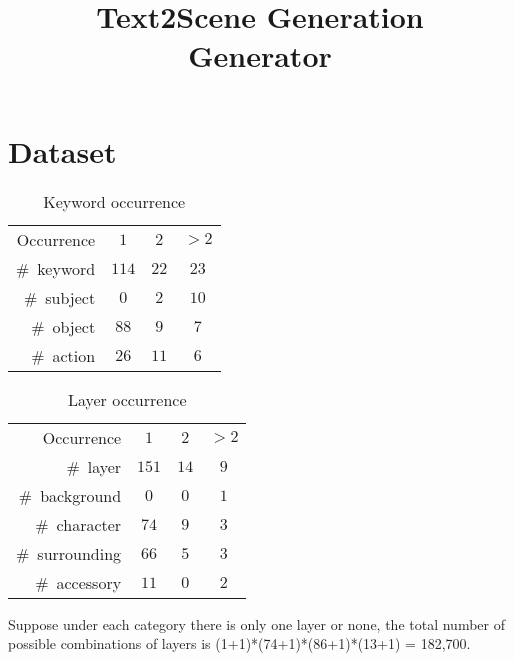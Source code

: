 \documentclass{article} %
\title{Text2Scene Generation \\ Generator}
\author{
}
\begin{document}
\maketitle

\begin{abstract}
\end{abstract}

\section{Dataset}

\begin{table}[htbp]
	\caption{Keyword occurrence}
	\centering
	\begin{tabular}{rccc}
		\toprule
		Occurrence & $1$ & $2$ & $>2$\\
		\#~keyword & $114$ & $22$ & $23$\\
		\midrule
		\#~subject & $0$ & $2$ & $10$\\
		\#~object & $88$ & $9$ & $7$\\
		\#~action & $26$ & $11$ & $6$\\
		\bottomrule
	\end{tabular}%
	\label{tab: feat}
\end{table}

\begin{table}[htbp]
	\caption{Layer occurrence}
	\centering
	\begin{tabular}{rccc}
		\toprule
		Occurrence & $1$ & $2$ & $>2$\\
		\#~layer & $151$ & $14$ & $9$\\
		\midrule
		\#~background & $0$ & $0$ & $1$\\
		\#~character & $74$ & $9$ & $3$\\
		\#~surrounding & $66$ & $5$ & $3$\\
		\#~accessory & $11$ & $0$ & $2$\\
		
		\bottomrule
	\end{tabular}%
	\label{tab: feat}
\end{table}

Suppose under each category there is only one layer or none, the total number of possible combinations of layers is (1+1)*(74+1)*(86+1)*(13+1) = 182,700.
\end{document}
